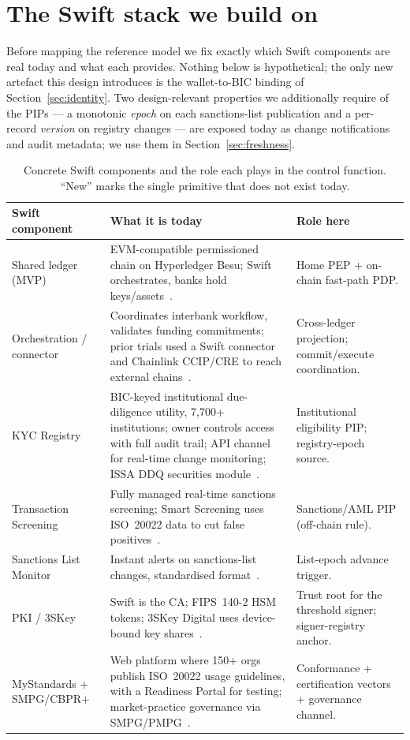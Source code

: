\documentclass[11pt,a4paper]{article}
\begin{document}
\section{The Swift stack we build on}
\label{sec:stack}

Before mapping the reference model we fix exactly which Swift components are real
today and what each provides. Nothing below is hypothetical; the only new
artefact this design introduces is the wallet-to-BIC binding of
Section~\ref{sec:identity}. Two design-relevant properties we additionally
require of the PIPs --- a monotonic \emph{epoch} on each sanctions-list
publication and a per-record \emph{version} on registry changes --- are exposed
today as change notifications and audit metadata; we use them in
Section~\ref{sec:freshness}.

\begin{table}[h]
\centering
\caption{Concrete Swift components and the role each plays in the control
function. ``New'' marks the single primitive that does not exist today.}
\label{tab:stack}
\begin{tabularx}{\textwidth}{@{}p{3.5cm} L p{3.0cm}@{}}
\toprule
\textbf{Swift component} & \textbf{What it is today} & \textbf{Role here} \\
\midrule
Shared ledger (MVP) & EVM-compatible permissioned chain on Hyperledger Besu;
Swift orchestrates, banks hold keys/assets~\cite{swiftmvp}. & Home PEP + on-chain
fast-path PDP. \\
Orchestration / connector & Coordinates interbank workflow, validates funding
commitments; prior trials used a Swift connector and Chainlink CCIP/CRE to reach
external chains~\cite{swiftmvp,swiftchainlink23,swiftcbdc}. & Cross-ledger
projection; commit/execute coordination. \\
KYC Registry & BIC-keyed institutional due-diligence utility, 7{,}700+
institutions; owner controls access with full audit trail; API channel for
real-time change monitoring; ISSA DDQ securities module~\cite{swiftkyc,swiftkycdata}. &
Institutional eligibility PIP; registry-epoch source. \\
Transaction Screening & Fully managed real-time sanctions screening; Smart
Screening uses ISO~20022 data to cut false positives~\cite{swifttxnscreen}. &
Sanctions/AML PIP (off-chain rule). \\
Sanctions List Monitor & Instant alerts on sanctions-list changes, standardised
format~\cite{swiftslm}. & List-epoch advance trigger. \\
PKI / 3SKey & Swift is the CA; FIPS~140-2 HSM tokens; 3SKey Digital uses
device-bound key shares~\cite{swift3skey,swiftpki,swift3skeyfs}. & Trust root for
the threshold signer; signer-registry anchor. \\
MyStandards + SMPG/CBPR+ & Web platform where 150+ orgs publish ISO~20022 usage
guidelines, with a Readiness Portal for testing; market-practice governance via
SMPG/PMPG~\cite{swiftmystd,swiftsmpg}. & Conformance + certification vectors +
governance channel. \\
\bottomrule
\end{tabularx}
\end{table}
\end{document}
